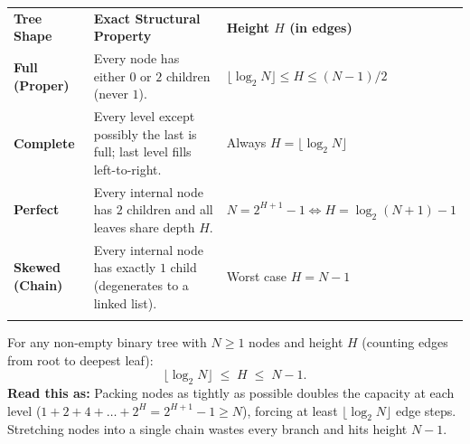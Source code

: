 \documentclass[11pt,a4paper]{article}
\theoremstyle{definition}
\begin{document}
\begingroup\small{}
\begin{tabularx}{\textwidth}{>{\raggedright\arraybackslash\bfseries}p{3.0cm} >{\raggedright\arraybackslash}X >{\raggedright\arraybackslash}p{4.1cm}}
\arrayrulecolor{primaryblue}\toprule[1.1pt]
\rowcolor{primaryblue!10}
\textcolor{primaryblue}{\textbf{Tree Shape}} & \textcolor{primaryblue}{\textbf{Exact Structural Property}} & \textcolor{primaryblue}{\textbf{Height $H$ (in edges)}} \\
\arrayrulecolor{codeframe}\midrule[0.6pt]
Full (Proper) & Every node has either $0$ or $2$ children (never $1$). & $\lfloor \log_2 N \rfloor \le H \le (N - 1)/2$ \\
Complete & Every level except possibly the last is full; last level fills left-to-right. & Always $H = \lfloor \log_2 N \rfloor$ \\
Perfect & Every internal node has $2$ children and all leaves share depth $H$. & $N = 2^{H+1} - 1 \iff H = \log_2(N{+}1) - 1$ \\
Skewed (Chain) & Every internal node has exactly $1$ child (degenerates to a linked list). & Worst case $H = N - 1$ \\
\arrayrulecolor{primaryblue}\bottomrule[1.1pt]
\end{tabularx}\endgroup

\begin{formulabox}
For any non-empty binary tree with $N \ge 1$ nodes and height $H$ (counting edges from root to deepest leaf):
$$\lfloor \log_2 N \rfloor \;\le\; H \;\le\; N - 1.$$
\textbf{Read this as:} Packing nodes as tightly as possible doubles the capacity at each level ($1 + 2 + 4 + \dots + 2^H = 2^{H+1} - 1 \ge N$), forcing at least $\lfloor \log_2 N \rfloor$ edge steps. Stretching nodes into a single chain wastes every branch and hits height $N - 1$.
\end{formulabox}
\end{document}
